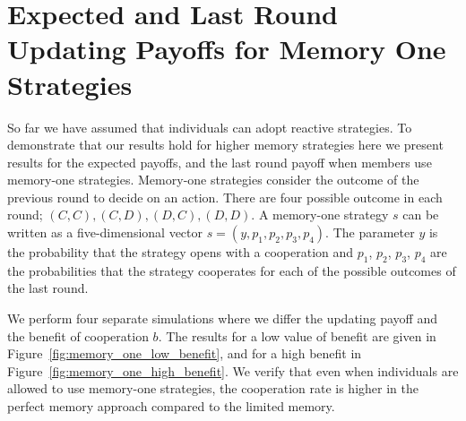 \documentclass[11pt]{article}
\theoremstyle{plainCl1}
\theoremstyle{plainCl2}
\begin{document}
\section{Expected and Last Round Updating Payoffs for Memory One Strategies}\label{section:memory_one}

So far we have assumed that individuals can adopt reactive strategies.
To demonstrate that our results hold for higher memory strategies here we
present results for the expected payoffs, and the last round payoff when members
use memory-one strategies. Memory-one strategies consider the outcome of the
previous round to decide on an action. There are four possible outcome in each
round; \((C, C), (C, D), (D, C), (D, D)\). A memory-one strategy \(s\) can be
written as a five-dimensional vector \(s=(y, p_1, p_2, p_3, p_4)\). The
parameter \(y\) is the probability that the strategy opens with a cooperation
and \(p_1\), \(p_2\), \(p_3\), \(p_4\) are the probabilities that the strategy
cooperates for each of the possible outcomes of the last round.

We perform four separate simulations where we differ the updating payoff and the
benefit of cooperation \(b\). The results for a low value of benefit are given
in Figure~\ref{fig:memory_one_low_benefit}, and for a high benefit in
Figure~\ref{fig:memory_one_high_benefit}. We verify that even when individuals
are allowed to use memory-one strategies, the cooperation rate is higher
in the perfect memory approach compared to the limited memory.
\end{document}
